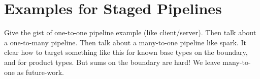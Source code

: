 


\section{Examples for Staged Pipelines}

Give the gist of one-to-one pipeline example (like client/server).
Then talk about a one-to-many pipeline.
Then talk about a many-to-one pipeline like spark.  It clear how to target something like this for known base types on the boundary, and for product types.  But sums on the boundary are hard!  We leave many-to-one as future-work.
